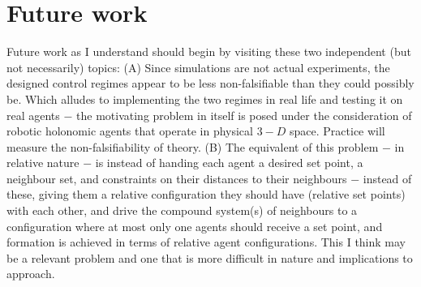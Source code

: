 \chapter{Future work}

Future work as I understand should begin by visiting these two independent (but
not necessarily) topics:
(A) Since simulations are not actual experiments, the designed control regimes
appear to be less non-falsifiable than they could possibly be. Which alludes to
implementing the two regimes in real life and testing it on real agents $-$ the
motivating problem in itself is posed under the consideration of robotic
holonomic agents that operate in physical $3-D$ space. Practice will measure the
non-falsifiability of theory.
(B) The equivalent of this problem $-$ in relative nature $-$ is instead of
handing each agent a desired set point, a neighbour set, and constraints on
their distances to their neighbours $-$ instead of these, giving them a
relative configuration they should have (relative set points) with each other,
and drive the compound system(s) of neighbours to a configuration where at most
only one agents should receive a set point, and formation is achieved in
terms of relative agent configurations. This I think may be a relevant problem
and one that is more difficult in nature and implications to approach.
